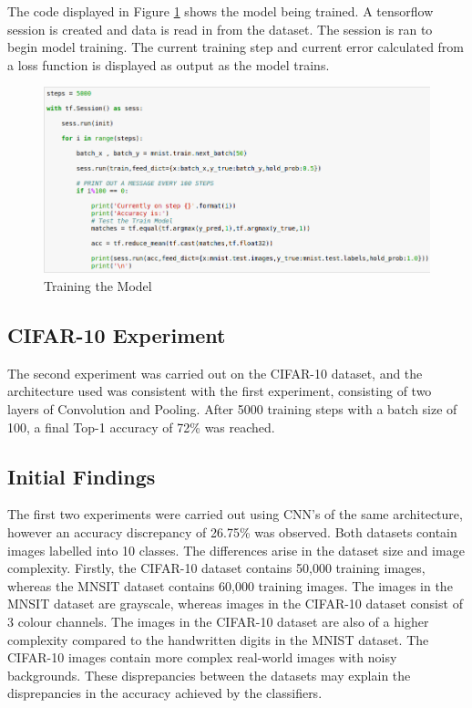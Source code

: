\documentclass[12pt]{report}
\begin{document}
\begin{flushleft}
The code displayed in Figure \ref{fig:training} shows the model being trained. A tensorflow session is created and data is read in from the dataset. The session is ran to begin model training. The current training step and current error calculated from a loss function is displayed as output as the model trains.
\end{flushleft}

\vspace{0.5cm}
\begin{figure}[ht!]
	\centering
	\includegraphics[width=12cm]{training}
	\caption{Training the Model}
	\label{fig:training}
\end{figure}

\newpage
\subsection{CIFAR-10 Experiment}

\begin{flushleft}
The second experiment was carried out on the CIFAR-10 dataset, and the architecture used was consistent with the first experiment, consisting of two layers of Convolution and Pooling. After 5000 training steps with a batch size of 100, a final Top-1 accuracy of 72\% was reached.
\end{flushleft}

\subsection{Initial Findings}

The first two experiments were carried out using CNN's of the same architecture, however an accuracy discrepancy of 26.75\% was observed. Both datasets contain images labelled into 10 classes. The differences arise in the dataset size and image complexity. Firstly, the CIFAR-10 dataset contains 50,000 training images, whereas the MNSIT dataset contains 60,000 training images. The images in the MNSIT dataset are grayscale, whereas images in the CIFAR-10 dataset consist of 3 colour channels. The images in the CIFAR-10 dataset are also of a higher complexity compared to the handwritten digits in the MNIST dataset. The CIFAR-10 images contain more complex real-world images with noisy backgrounds. These disprepancies between the datasets may explain the disprepancies in the accuracy achieved by the classifiers.
\end{document}
